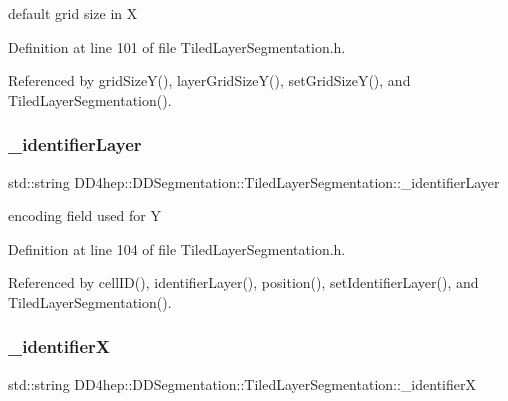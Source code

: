 default grid size in X 



Definition at line 101 of file Tiled\+Layer\+Segmentation.\+h.



Referenced by grid\+Size\+Y(), layer\+Grid\+Size\+Y(), set\+Grid\+Size\+Y(), and Tiled\+Layer\+Segmentation().

\hypertarget{class_d_d4hep_1_1_d_d_segmentation_1_1_tiled_layer_segmentation_a83e95ac7e65a186e5b15c4b72e57e1c6}{}\label{class_d_d4hep_1_1_d_d_segmentation_1_1_tiled_layer_segmentation_a83e95ac7e65a186e5b15c4b72e57e1c6} 
\subsubsection{\texorpdfstring{\+\_\+identifier\+Layer}{\_identifierLayer}}
{\footnotesize\ttfamily std\+::string D\+D4hep\+::\+D\+D\+Segmentation\+::\+Tiled\+Layer\+Segmentation\+::\+\_\+identifier\+Layer\hspace{0.3cm}{\ttfamily [protected]}}



encoding field used for Y 



Definition at line 104 of file Tiled\+Layer\+Segmentation.\+h.



Referenced by cell\+I\+D(), identifier\+Layer(), position(), set\+Identifier\+Layer(), and Tiled\+Layer\+Segmentation().

\hypertarget{class_d_d4hep_1_1_d_d_segmentation_1_1_tiled_layer_segmentation_ac79fffb5bdd56134ef2824ebb10ac1de}{}\label{class_d_d4hep_1_1_d_d_segmentation_1_1_tiled_layer_segmentation_ac79fffb5bdd56134ef2824ebb10ac1de} 
\subsubsection{\texorpdfstring{\+\_\+identifierX}{\_identifierX}}
{\footnotesize\ttfamily std\+::string D\+D4hep\+::\+D\+D\+Segmentation\+::\+Tiled\+Layer\+Segmentation\+::\+\_\+identifierX\hspace{0.3cm}{\ttfamily [protected]}}



